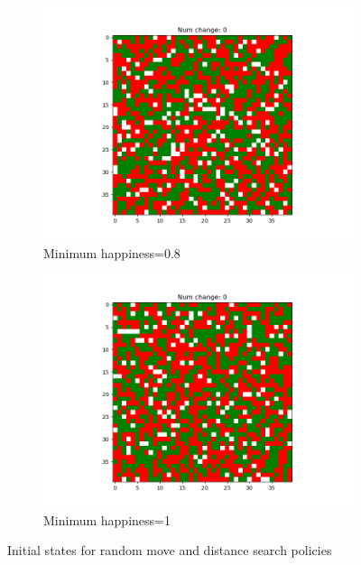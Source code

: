 \documentclass[11pt]{article}
\begin{document}
\begin{figure}[h]
\begin{subfigure}{0.14\textwidth}
		\end{subfigure}\hfill
		\begin{subfigure}{0.14\textwidth}
			\includegraphics[width=\linewidth]{policy4_initial_min8.png}
			\caption{\centering Minimum happiness=0.8}
			\label{distance_initialmin8}
		\end{subfigure}\hfill
		\begin{subfigure}{0.14\textwidth}
			\includegraphics[width=\linewidth]{policy4_initial_min1.png}
			\caption{\centering Minimum happiness=1}
			\label{distance_initialmin1}
		\end{subfigure}\hfill
		\caption{Initial states for random move and distance search policies}
		\label{distance_initialstate}
	\end{figure}
\end{document}
